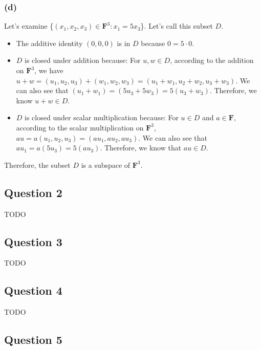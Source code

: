 \documentclass[12pt, letterpaper, oneside]{book}
\begin{document}
\subsubsection*{(d)}

Let's examine \{$(x_1, x_2, x_3) \in \mathbf{F}^3: x_1 = 5x_3$\}.
Let's call this subset $D$.

\begin{itemize}
  \item The additive identity $(0, 0, 0)$ is in $D$ because $0 = 5 \cdot 0$.
  \item $D$ is closed under addition because: For $u, w \in D$, according to
    the addition on $\mathbf{F}^3$, we have $u + w = (u_1, u_2, u_3) + (w_1,
    w_2, w_3) = (u_1 + w_1, u_2 + w_2, u_3 + w_3)$. We can also see that $(u_1
    + w_1) = (5u_3 + 5w_3) = 5(u_3 + w_3)$. Therefore, we know $u + w \in D$.
  \item $D$ is closed under scalar multiplication because: For $u \in D$ and $a
    \in \mathbf{F}$, according to the scalar multiplication on $\mathbf{F}^3$,
    $au = a(u_1, u_2, u_3) = (a u_1, a u_2, a u_3)$. We can also see that
    $a u_1 = a (5u_3) = 5(a u_3)$. Therefore, we know that $au \in D$.
\end{itemize}

Therefore, the subset $D$ is a subspace of $\mathbf{F}^3$.

\subsection{Question 2}

TODO

\subsection{Question 3}

TODO

\subsection{Question 4}

TODO

\subsection{Question 5}
\end{document}
